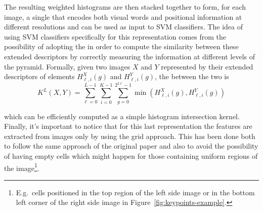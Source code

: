 \documentclass[../main.tex]{subfiles}
\begin{document}
The resulting weighted histograms are then stacked together to form, for each
image, a single 
that encodes both visual words and positional information at different
resolutions and can be used as input to SVM classifiers.
The idea of using SVM classifiers specifically for this representation comes
from the possibility of adopting the  in order to
compute the similarity between these extended descriptors by correctly measuring
the information at different levels of the pyramid. Formally, given two images
$X$ and $Y$ represented by their extended descriptors of elements
$H^{X}_{\ell, i}(g)$ and $H^{Y}_{\ell, i}(g)$,
the  between the two is 
\begin{equation}
  K^{L}(X,Y) = 
  \sum_{\ell=0}^{L-1}
  \sum_{i=0}^{K-1}
  \sum_{g=0}^{2^{2 \ell}-1}
  \min\left(H_{\ell, i}^{X}(g), H_{\ell, i}^{Y}(g)\right)
\end{equation}

which can be efficiently computed as a simple histogram intersection kernel.\\
Finally, it's important to notice that for this last representation the features
are extracted from images only by using the grid approach. This has been done
both to follow the same approach of the original paper and also to avoid the
possibility of having empty cells which might happen for those containing
uniform regions of the image\footnote{E.g.\ cells positioned in the top region
	of the left side image or in the bottom left corner of the right side
image in Figure~\ref{fig:keypoints-example}.}.
\end{document}
